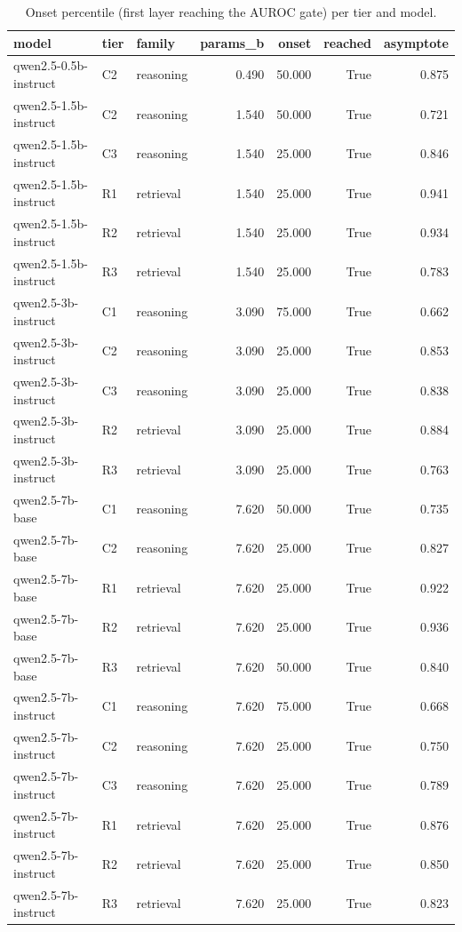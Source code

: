 \begin{table}
\caption{Onset percentile (first layer reaching the AUROC gate) per tier and model.}
\label{tab:t8_h4_depth_onsets}
\begin{tabular}{lllrrrr}
\toprule
model & tier & family & params\_b & onset & reached & asymptote \\
\midrule
qwen2.5-0.5b-instruct & C2 & reasoning & 0.490 & 50.000 & True & 0.875 \\
qwen2.5-1.5b-instruct & C2 & reasoning & 1.540 & 50.000 & True & 0.721 \\
qwen2.5-1.5b-instruct & C3 & reasoning & 1.540 & 25.000 & True & 0.846 \\
qwen2.5-1.5b-instruct & R1 & retrieval & 1.540 & 25.000 & True & 0.941 \\
qwen2.5-1.5b-instruct & R2 & retrieval & 1.540 & 25.000 & True & 0.934 \\
qwen2.5-1.5b-instruct & R3 & retrieval & 1.540 & 25.000 & True & 0.783 \\
qwen2.5-3b-instruct & C1 & reasoning & 3.090 & 75.000 & True & 0.662 \\
qwen2.5-3b-instruct & C2 & reasoning & 3.090 & 25.000 & True & 0.853 \\
qwen2.5-3b-instruct & C3 & reasoning & 3.090 & 25.000 & True & 0.838 \\
qwen2.5-3b-instruct & R2 & retrieval & 3.090 & 25.000 & True & 0.884 \\
qwen2.5-3b-instruct & R3 & retrieval & 3.090 & 25.000 & True & 0.763 \\
qwen2.5-7b-base & C1 & reasoning & 7.620 & 50.000 & True & 0.735 \\
qwen2.5-7b-base & C2 & reasoning & 7.620 & 25.000 & True & 0.827 \\
qwen2.5-7b-base & R1 & retrieval & 7.620 & 25.000 & True & 0.922 \\
qwen2.5-7b-base & R2 & retrieval & 7.620 & 25.000 & True & 0.936 \\
qwen2.5-7b-base & R3 & retrieval & 7.620 & 50.000 & True & 0.840 \\
qwen2.5-7b-instruct & C1 & reasoning & 7.620 & 75.000 & True & 0.668 \\
qwen2.5-7b-instruct & C2 & reasoning & 7.620 & 25.000 & True & 0.750 \\
qwen2.5-7b-instruct & C3 & reasoning & 7.620 & 25.000 & True & 0.789 \\
qwen2.5-7b-instruct & R1 & retrieval & 7.620 & 25.000 & True & 0.876 \\
qwen2.5-7b-instruct & R2 & retrieval & 7.620 & 25.000 & True & 0.850 \\
qwen2.5-7b-instruct & R3 & retrieval & 7.620 & 25.000 & True & 0.823 \\
\bottomrule
\end{tabular}
\end{table}
